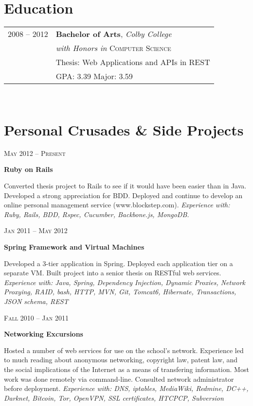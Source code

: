 \documentclass[10pt]{article} %
\begin{document}
{\begin{minipage}[t]{0.44\textwidth}
\section{Education}

\begin{tabular}{rl} %

2008 -- \textsc{2012} & \textbf{Bachelor of Arts}, \textit{Colby College}\\ 
											& \textit{with Honors in} \textsc{Computer Science} \\
											& \footnotesize Thesis: Web Applications and APIs in REST \\
											& \small{GPA: 3.39} \small{Major: 3.59} \\
\end{tabular}\\

\section{Personal Crusades \& Side Projects}


{\raggedleft\textsc{May 2012 -- Present}\par}
{\raggedright\large \textbf{Ruby on Rails}}
{\normalsize{ Converted thesis project to Rails to see if it would have been easier than in Java. Developed a strong appreciation for BDD. Deployed and continue to develop an online personal management service (www.blockstep.com).}
\textit{Experience with: Ruby, Rails, BDD, Rspec, Cucumber, Backbone.js, MongoDB. }}


{\raggedleft\textsc{Jan 2011 -- May 2012}\par}
{\raggedright\large \textbf{Spring Framework and Virtual Machines} }
{\normalsize{ Developed a 3-tier application in Spring. Deployed each application tier on a separate VM. Built project into a senior thesis on RESTful web services. }
\textit{Experience with: Java, Spring, Dependency Injection, Dynamic Proxies, Network Proxying, RAID, bash, HTTP, MVN, Git, Tomcat6, Hibernate, Transactions, JSON schema, REST } }

{\raggedleft\textsc{Fall 2010 -- Jan 2011}\par}
{\raggedright\large \textbf{Networking Excursions} }
{\normalsize{Hosted a number of web services for use on the school's network. Experience led to much reading about anonymous networking, copyright law, patent law, and the social implications of the Internet as a means of transfering information. Most work was done remotely via command-line. Consulted network administrator before deployment. }
\textit{Experience with: DNS, iptables, MediaWiki, Redmine, DC++, Darknet, Bitcoin, Tor, OpenVPN, SSL certificates, HTCPCP, Subversion}}\\



\end{minipage}}
\end{document}
